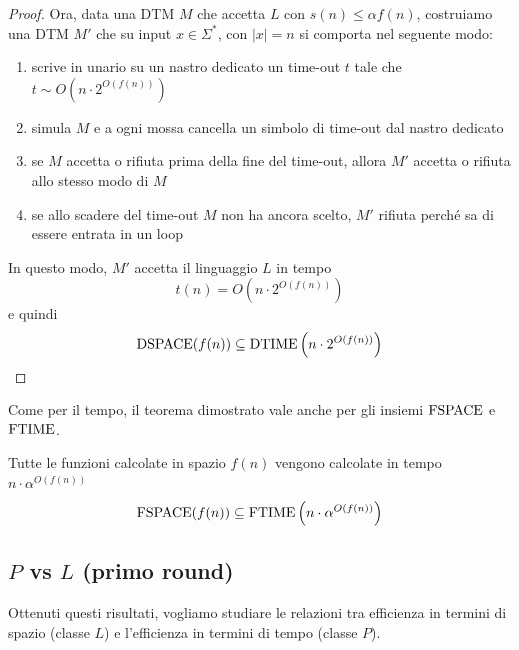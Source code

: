 \begin{proof}
	Ora, data una DTM $M$ che accetta $L$ con $s(n) \leq \alpha f(n)$, costruiamo una DTM $M'$ che su input $x \in \Sigma^\ast$, con $|x| = n$ si comporta nel seguente modo:
	\begin{enumerate}
		\item scrive in unario su un nastro dedicato un time-out $t$ tale che $t \sim O\left(n \cdot 2^{O(f(n))}\right)$
		\item simula $M$ e a ogni mossa cancella un simbolo di time-out dal nastro dedicato
		\item se $M$ accetta o rifiuta prima della fine del time-out, allora $M'$ accetta o rifiuta allo stesso modo di $M$
		\item se allo scadere del time-out $M$ non ha ancora scelto, $M'$ rifiuta perché sa di essere entrata in un loop
	\end{enumerate} 
	
	In questo modo, $M'$ accetta il linguaggio $L$ in tempo
	$$ t(n) = O \left(n \cdot 2^{O(f(n))}\right) $$
	e quindi 
	$$ \text{DSPACE}(f(n)) \subseteq \text{DTIME} \left(n \cdot 2^{O(f(n))}\right) $$
\end{proof}

Come per il tempo, il teorema dimostrato vale anche per gli insiemi $\text{FSPACE}$ e $\text{FTIME}$.\\

\begin{theor}
	Tutte le funzioni calcolate in spazio $f(n)$ vengono calcolate in tempo $n \cdot \alpha^{O(f(n))}$
	$$ \text{FSPACE} (f(n)) \subseteq \text{FTIME} \left(n \cdot \alpha^{O(f(n))}\right)$$
\end{theor}

\subsection{$P$ vs $L$ (primo round)}

Ottenuti questi risultati, vogliamo studiare le relazioni tra efficienza in termini di spazio (classe $L$) e l'efficienza in termini di tempo (classe $P$).\\

